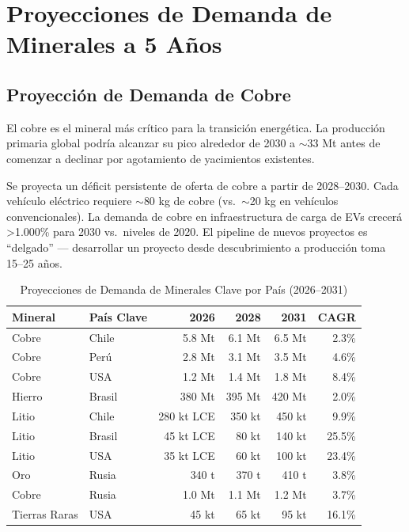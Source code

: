 \chapter{Proyecciones de Demanda de Minerales a 5 Años}

\section{Proyección de Demanda de Cobre}

El cobre es el mineral más crítico para la transición energética. La producción primaria global podría alcanzar su pico alrededor de 2030 a $\sim$33 Mt antes de comenzar a declinar por agotamiento de yacimientos existentes.

\begin{keyinsightbox}
Se proyecta un déficit persistente de oferta de cobre a partir de 2028--2030. Cada vehículo eléctrico requiere $\sim$80 kg de cobre (vs.\ $\sim$20 kg en vehículos convencionales). La demanda de cobre en infraestructura de carga de EVs crecerá >1.000\% para 2030 vs.\ niveles de 2020. El pipeline de nuevos proyectos es ``delgado'' — desarrollar un proyecto desde descubrimiento a producción toma 15--25 años.
\end{keyinsightbox}

\begin{table}[htbp]
\centering
\caption{Proyecciones de Demanda de Minerales Clave por País (2026--2031)}
\begin{tabular}{@{}llrrrr@{}}
\toprule
\textbf{Mineral} & \textbf{País Clave} & \textbf{2026} & \textbf{2028} & \textbf{2031} & \textbf{CAGR} \\
\midrule
Cobre & Chile & 5.8 Mt & 6.1 Mt & 6.5 Mt & 2.3\% \\
\rowcolor{tablealt} Cobre & Perú & 2.8 Mt & 3.1 Mt & 3.5 Mt & 4.6\% \\
Cobre & USA & 1.2 Mt & 1.4 Mt & 1.8 Mt & 8.4\% \\
\rowcolor{tablealt} Hierro & Brasil & 380 Mt & 395 Mt & 420 Mt & 2.0\% \\
Litio & Chile & 280 kt LCE & 350 kt & 450 kt & 9.9\% \\
\rowcolor{tablealt} Litio & Brasil & 45 kt LCE & 80 kt & 140 kt & 25.5\% \\
Litio & USA & 35 kt LCE & 60 kt & 100 kt & 23.4\% \\
\rowcolor{tablealt} Oro & Rusia & 340 t & 370 t & 410 t & 3.8\% \\
Cobre & Rusia & 1.0 Mt & 1.1 Mt & 1.2 Mt & 3.7\% \\
\rowcolor{tablealt} Tierras Raras & USA & 45 kt & 65 kt & 95 kt & 16.1\% \\
\bottomrule
\end{tabular}
\label{tab:mineral_demand}
\end{table}

